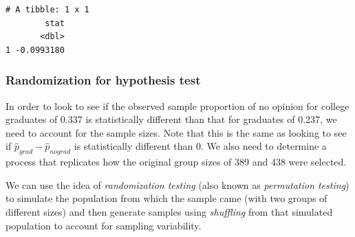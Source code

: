 \documentclass[12pt, krantz2,]{krantz}
\makeatletter
\newenvironment{Shaded}{\begin{snugshade}}{\end{snugshade}}
\newcommand{\DataTypeTok}[1]{\textcolor[rgb]{0.27,0.27,0.27}{#1}}
\newcommand{\DecValTok}[1]{\textcolor[rgb]{0.06,0.06,0.06}{#1}}
\newcommand{\KeywordTok}[1]{\textcolor[rgb]{0.27,0.27,0.27}{\textbf{#1}}}
\newcommand{\NormalTok}[1]{#1}
\newcommand{\OperatorTok}[1]{\textcolor[rgb]{0.43,0.43,0.43}{\textbf{#1}}}
\newcommand{\StringTok}[1]{\textcolor[rgb]{0.5,0.5,0.5}{#1}}
\newenvironment{kframe}{%
\medskip{}
\setlength{\fboxsep}{.8em}
 \def\at@end@of@kframe{}%
 \ifinner\ifhmode%
  \def\at@end@of@kframe{\end{minipage}}%
  \begin{minipage}{\columnwidth}%
 \fi\fi%
 \def\FrameCommand##1{\hskip\@totalleftmargin \hskip-\fboxsep
 \colorbox{shadecolor}{##1}\hskip-\fboxsep
     \hskip-\linewidth \hskip-\@totalleftmargin \hskip\columnwidth}%
 \MakeFramed {\advance\hsize-\width
   \@totalleftmargin\z@ \linewidth\hsize
   \@setminipage}}%
 {\par\unskip\endMakeFramed%
 \at@end@of@kframe}
\renewenvironment{Shaded}{\begin{kframe}}{\end{kframe}}
\makeatother
\begin{document}
\begin{verbatim}
# A tibble: 1 x 1
        stat
       <dbl>
1 -0.0993180
\end{verbatim}

\hypertarget{randomization-for-hypothesis-test}{%
\subsubsection*{Randomization for hypothesis test}\label{randomization-for-hypothesis-test}}


In order to look to see if the observed sample proportion of no opinion for college graduates of 0.337 is statistically different than that for graduates of 0.237, we need to account for the sample sizes. Note that this is the same as looking to see if \(\hat{p}_{grad} - \hat{p}_{nograd}\) is statistically different than 0. We also need to determine a process that replicates how the original group sizes of 389 and 438 were selected.

We can use the idea of \emph{randomization testing} (also known as \emph{permutation testing}) to simulate the population from which the sample came (with two groups of different sizes) and then generate samples using \emph{shuffling} from that simulated population to account for sampling variability.

\begin{Shaded}
\end{Shaded}

\begin{Shaded}
\end{Shaded}
\end{document}
